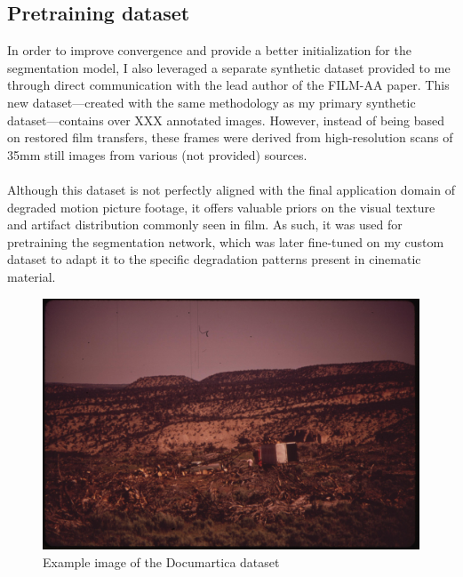 \documentclass[openany, 12pt]{article}
\begin{document}
	\subsection{Pretraining dataset}
	In order to improve convergence and provide a better initialization for the segmentation model, I also leveraged a separate synthetic dataset provided to me through direct communication with the lead author of the FILM-AA paper. This new dataset—created with the same methodology as my primary synthetic dataset—contains over XXX annotated images. However, instead of being based on restored film transfers, these frames were derived from high-resolution scans of 35mm still images from various (not provided) sources.\\\\
	Although this dataset is not perfectly aligned with the final application domain of degraded motion picture footage, it offers valuable priors on the visual texture and artifact distribution commonly seen in film. As such, it was used for pretraining the segmentation network, which was later fine-tuned on my custom dataset to adapt it to the specific degradation patterns present in cinematic material.
			\begin{figure}[h!]
		\centering
\includegraphics[width=0.5\linewidth]{images/docum.jpg}
		\caption{\smaller Example image of the Documartica dataset} 
	\end{figure}
	
\end{document}
